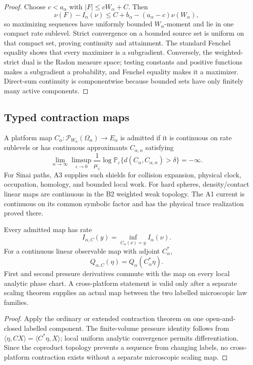 \begin{proof}
Choose \(c<a_\alpha\) with \(|F|\le cW_\alpha+C\).  Then
\[
\nu(F)-I_\alpha(\nu)
\le C+b_\alpha-(a_\alpha-c)\nu(W_\alpha),
\]
so maximizing sequences have uniformly bounded \(W_\alpha\)-moment and lie in
one compact rate sublevel.  Strict convergence on a bounded source set is
uniform on that compact set, proving continuity and attainment.  The standard
Fenchel equality shows that every maximizer is a subgradient.  Conversely, the
weighted-strict dual is the Radon measure space; testing constants and positive
functions makes a subgradient a probability, and Fenchel equality makes it a
maximizer.  Direct-sum continuity is componentwise because bounded sets have
only finitely many active components.
\end{proof}

\subsection{Typed contraction maps}

A platform map
\(C_\alpha:\mathcal P_{W_\alpha}(\Omega_\alpha)\to E_\alpha\) is admitted if
it is continuous on rate sublevels or has continuous approximants
\(C_{\alpha,n}\) satisfying
\[
\lim_{n\to\infty}\limsup_{\varepsilon\to0}
\frac1{\mu_\varepsilon}\log
\mathbb P_\varepsilon
\{d(C_\alpha,C_{\alpha,n})>\delta\}=-\infty.
\]
For Sinai paths, A3 supplies such shields for collision expansion, physical
clock, occupation, homology, and bounded local work.  For hard spheres,
density/contact linear maps are continuous in the B2 weighted weak topology.
The A1 current is continuous on its common symbolic factor and has the
physical trace realization proved there.

\begin{theorem}
\label{thm:r6-c2-contraction}
Every admitted map has rate
\[
I_{\alpha,C}(y)=\inf_{C_\alpha(\nu)=y}I_\alpha(\nu).
\]
For a continuous linear observable map with adjoint \(C_\alpha^*\),
\[
Q_{\alpha,C}(\eta)=Q_\alpha(C_\alpha^*\eta).
\]
First and second pressure derivatives commute with the map on every local
analytic phase chart.  A cross-platform statement is valid only after a
separate scaling theorem supplies an actual map between the two labelled
microscopic law families.
\end{theorem}

\begin{proof}
Apply the ordinary or extended contraction theorem on one open-and-closed
labelled component.  The finite-volume pressure identity follows from
\(\langle\eta,CX\rangle=\langle C^*\eta,X\rangle\); local uniform analytic
convergence permits differentiation.  Since the coproduct topology prevents a
sequence from changing labels, no cross-platform contraction exists without a
separate microscopic scaling map.
\end{proof}

